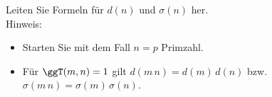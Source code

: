 \begin{aufgabe}
Leiten Sie Formeln für $d(n)$ und $\sigma(n)$ her.\\
Hinweis:
\begin{itemize}
  \item[-] Starten Sie mit dem Fall $n = p$ Primzahl.
  \item[-] Für $\ggT(m, n) = 1$ gilt $d(m\,n) = d(m)\,d(n)$ bzw.\ $\sigma(m\,n) = \sigma(m)\,\sigma(n)$.
\end{itemize}
\end{aufgabe}
